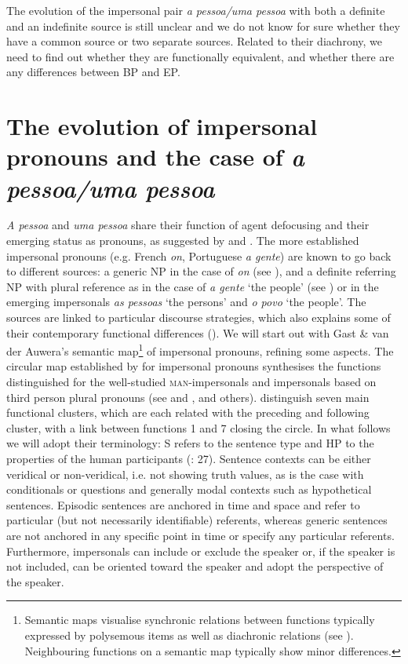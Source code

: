 \documentclass[output=paper]{langscibook}
\begin{document}
The evolution of the impersonal pair \textit{a pessoa/uma pessoa} with both a definite and an indefinite source is still unclear and we do not know for sure whether they have a common source or two separate sources. Related to their diachrony, we need to find out whether they are functionally equivalent, and whether there are any differences between BP and EP.



\section{The evolution of impersonal pronouns and the case of \textit{a pessoa/uma pessoa}}\label{sec:amaral:3}



{\textit{A pessoa} }{and} {\textit{uma pessoa} }{share their function of agent defocusing and their emerging status as pronouns, as suggested by \citet{AmaralMihatsch2019} and \citet{Mihatsch2017}. The more established impersonal pronouns (e.g. French} {\textit{on}}{, Portuguese} {\textit{a gente}}{) are known to go back to different sources:  a generic NP in the case of} {\textit{on}}{ (see  \citealt{GiacaloneRamatSansò2007, GiacaloneRamatSansò2011}), and a definite referring NP with plural reference as in the case of} {\textit{a gente}} {‘the people’ (see \citealt{Lopes2003,Lopes2004}) or in the emerging impersonals} {\textit{as pessoas}} {‘the persons’ and} {\textit{o povo} }{‘the people’. The sources are linked to particular discourse strategies, which also explains some of their contemporary functional differences (\citealt{AmaralMihatsch2019}). We will start out with Gast \& van der Auwera’s semantic map}\footnote{Semantic maps visualise synchronic relations between functions typically expressed by polysemous items as well as diachronic relations (see \citealt{Haspelmath2003}). Neighbouring functions on a semantic map typically show minor differences.} {of impersonal pronouns, refining some aspects. The circular map established by \citet{GastvanderAuwera2013} for impersonal pronouns synthesises the functions distinguished for the well-studied} {\textsc{man}}{{}-impersonals and impersonals based on third person plural pronouns (see \citealt{Siewierska2011} and \citealt{CabredoHofherr2006,CabredoHofherr2008}, and others). \citet{GastvanderAuwera2013} distinguish seven main functional clusters, which are each related with the preceding and following cluster, with a link between functions 1 and 7 closing the circle. In what follows we will adopt their terminology: S refers to the sentence type and HP to the properties of the human participants (\citealt{GastvanderAuwera2013}: 27). Sentence contexts can be either veridical or non-veridical, i.e. not showing truth values, as is the case with conditionals or questions and generally modal contexts such as hypothetical sentences. Episodic sentences are anchored in time and space and refer to particular (but not necessarily identifiable) referents, whereas generic sentences are not anchored in any specific point in time or specify any particular referents. Furthermore, impersonals can include or exclude the speaker or, if the speaker is not included, can be oriented toward the speaker and adopt the perspective of the speaker.}
\end{document}
